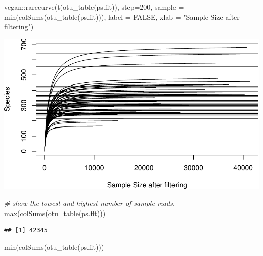 \documentclass[
]{book}
\newenvironment{Shaded}{\begin{snugshade}}{\end{snugshade}}
\newcommand{\AttributeTok}[1]{\textcolor[rgb]{0.77,0.63,0.00}{#1}}
\newcommand{\CommentTok}[1]{\textcolor[rgb]{0.56,0.35,0.01}{\textit{#1}}}
\newcommand{\ConstantTok}[1]{\textcolor[rgb]{0.00,0.00,0.00}{#1}}
\newcommand{\DecValTok}[1]{\textcolor[rgb]{0.00,0.00,0.81}{#1}}
\newcommand{\FunctionTok}[1]{\textcolor[rgb]{0.00,0.00,0.00}{#1}}
\newcommand{\NormalTok}[1]{#1}
\newcommand{\SpecialCharTok}[1]{\textcolor[rgb]{0.00,0.00,0.00}{#1}}
\newcommand{\StringTok}[1]{\textcolor[rgb]{0.31,0.60,0.02}{#1}}
\begin{document}
\hfill\break

\begin{Shaded}
\begin{Highlighting}[]
\NormalTok{vegan}\SpecialCharTok{::}\FunctionTok{rarecurve}\NormalTok{(}\FunctionTok{t}\NormalTok{(}\FunctionTok{otu\_table}\NormalTok{(ps.flt)), }
                 \AttributeTok{step=}\DecValTok{200}\NormalTok{, }\AttributeTok{sample =} \FunctionTok{min}\NormalTok{(}\FunctionTok{colSums}\NormalTok{(}\FunctionTok{otu\_table}\NormalTok{(ps.flt))), }
                 \AttributeTok{label =} \ConstantTok{FALSE}\NormalTok{, }\AttributeTok{xlab =} \StringTok{"Sample Size after filtering"}\NormalTok{) }
\end{Highlighting}
\end{Shaded}

\includegraphics{gitbook-demo_files/figure-latex/rarefaction-1.pdf}

\begin{Shaded}
\begin{Highlighting}[]
\CommentTok{\# show the lowest and highest number of sample reads.  }
\FunctionTok{max}\NormalTok{(}\FunctionTok{colSums}\NormalTok{(}\FunctionTok{otu\_table}\NormalTok{(ps.flt)))}
\end{Highlighting}
\end{Shaded}

\begin{verbatim}
## [1] 42345
\end{verbatim}

\begin{Shaded}
\begin{Highlighting}[]
\FunctionTok{min}\NormalTok{(}\FunctionTok{colSums}\NormalTok{(}\FunctionTok{otu\_table}\NormalTok{(ps.flt)))}
\end{Highlighting}
\end{Shaded}
\end{document}
